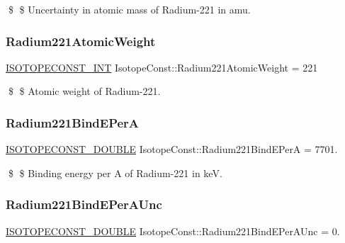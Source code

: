 \$ \$ Uncertainty in atomic mass of Radium-\/221 in amu. \mbox{\label{group___isotope_const-_radium-_ra221_ga83f18ad5d40a12894901a81cc7a01091}} 
\subsubsection{\texorpdfstring{Radium221\+Atomic\+Weight}{Radium221AtomicWeight}}
{\footnotesize\ttfamily \mbox{\hyperlink{group___isotope_const-_macros_ga5f18360b3e99483a35c32d789e62621c}{I\+S\+O\+T\+O\+P\+E\+C\+O\+N\+S\+T\+\_\+\+I\+NT}} Isotope\+Const\+::\+Radium221\+Atomic\+Weight = 221}

\$ \$ Atomic weight of Radium-\/221. \mbox{\label{group___isotope_const-_radium-_ra221_gaa18e4606ee685e4edb3ff4aef975ec35}} 
\subsubsection{\texorpdfstring{Radium221\+Bind\+E\+PerA}{Radium221BindEPerA}}
{\footnotesize\ttfamily \mbox{\hyperlink{group___isotope_const-_macros_ga8f45a7272ce02c0b4c65c44636ed719a}{I\+S\+O\+T\+O\+P\+E\+C\+O\+N\+S\+T\+\_\+\+D\+O\+U\+B\+LE}} Isotope\+Const\+::\+Radium221\+Bind\+E\+PerA = 7701.}

\$ \$ Binding energy per A of Radium-\/221 in keV. \mbox{\label{group___isotope_const-_radium-_ra221_gac974043531b43f830e0b09fffb31fc40}} 
\subsubsection{\texorpdfstring{Radium221\+Bind\+E\+Per\+A\+Unc}{Radium221BindEPerAUnc}}
{\footnotesize\ttfamily \mbox{\hyperlink{group___isotope_const-_macros_ga8f45a7272ce02c0b4c65c44636ed719a}{I\+S\+O\+T\+O\+P\+E\+C\+O\+N\+S\+T\+\_\+\+D\+O\+U\+B\+LE}} Isotope\+Const\+::\+Radium221\+Bind\+E\+Per\+A\+Unc = 0.}

